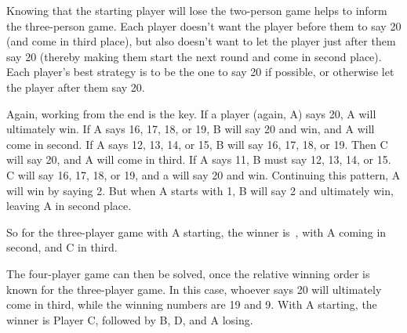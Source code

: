 \documentclass{article}
\begin{document}
Knowing that the starting player will lose the two-person game helps to inform the three-person game.
Each player doesn't want the player before them to say 20 (and come in third place), but also doesn't want to let the player just after them say 20 (thereby making them start the next round and come in second place).
Each player's best strategy is to be the one to say 20 if possible, or otherwise let the player after them say 20.

Again, working from the end is the key.
If a player (again, A) says 20, A will ultimately win.
If A says 16, 17, 18, or 19, B will say 20 and win, and A will come in second.
If A says 12, 13, 14, or 15, B will say 16, 17, 18, or 19.
Then C will say 20, and A will come in third.
If A says 11, B must say 12, 13, 14, or 15.
C will say 16, 17, 18, or 19, and a will say 20 and win.
Continuing this pattern, A will win by saying 2.
But when A starts with 1, B will say 2 and ultimately win, leaving A in second place.

So for the three-player game with A starting, the winner is
\,, with A coming in second, and C in third.

The four-player game can then be solved, once the relative winning order is known for the three-player game.
In this case, whoever says 20 will ultimately come in third, while the winning numbers are 19 and 9.
With A starting, the winner is Player C, followed by B, D, and A losing.
\end{document}

